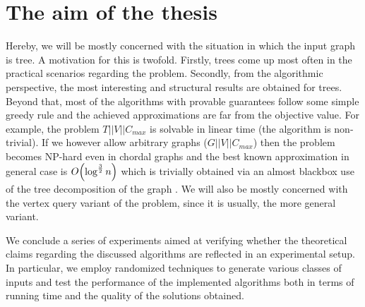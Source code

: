 \section{The aim of the thesis}

Hereby, we will be mostly concerned with the situation in which the input graph is tree. A motivation for this is twofold. Firstly, trees come up most often in the practical scenarios regarding the problem. Secondly, from the algorithmic perspective, the most interesting and structural results are obtained for trees. Beyond that, most of the algorithms with provable guarantees follow some simple greedy rule and the achieved approximations are far from the objective value. For example, the problem $T||V||C_{max}$ is solvable in linear time (the algorithm is non-trivial)\cite{Schaffer1989OptNodeRankOfTsInLinTime}. If we however allow arbitrary graphs ($G||V||C_{max}$) then the problem becomes NP-hard even in chordal graphs \cite{DereniowskiVxRankOfChGsAndWTs} and the best known approximation in general case is $O\mathopen{}\left( \log^{\frac{3}{2}} n  \right)$ which is trivially obtained via an almost blackbox use of the tree decomposition of the graph \cite{RankingsofGraphs}. We will also be mostly concerned with the vertex query variant of the problem, since it is usually, the more general variant. 

We conclude a series of experiments aimed at verifying whether the theoretical claims regarding the discussed algorithms are reflected in an experimental setup. In particular, we employ randomized techniques to generate various classes of inputs and test the performance of the implemented algorithms both in terms of running time and the quality of the solutions obtained.
